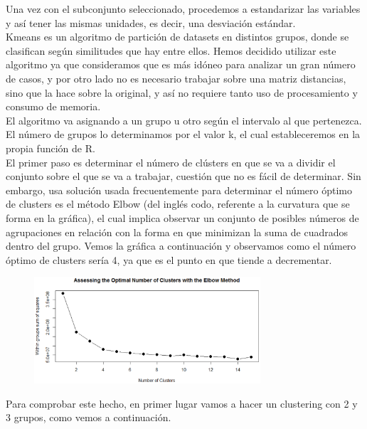 \documentclass[10pt]{article}
\begin{document}
Una vez con el subconjunto seleccionado, procedemos a estandarizar las variables y así tener las mismas unidades, es decir, una desviación estándar.\\

Kmeans es un algoritmo de partición de datasets en distintos grupos, donde se clasifican según similitudes que hay entre ellos. 
Hemos decidido utilizar este algoritmo ya que consideramos que es más idóneo para analizar un gran número de casos, y por otro lado no es necesario trabajar sobre una matriz distancias, sino que la hace sobre la original, y así no requiere tanto uso de procesamiento y consumo de memoria. \\

El algoritmo va asignando a un grupo u otro según el intervalo al que pertenezca. El número de grupos lo determinamos por el valor k, el cual estableceremos en la propia función de R.\\

El primer paso es determinar el número de clústers en que se va a dividir el conjunto sobre el que se va a trabajar, cuestión que no es fácil de determinar. Sin embargo, usa solución usada frecuentemente para determinar el número óptimo de clusters es el método Elbow (del inglés codo, referente a la curvatura que se forma en la gráfica), el cual implica observar un conjunto de posibles números de agrupaciones en relación con la forma en que minimizan la suma de cuadrados dentro del grupo. Vemos la gráfica a continuación y observamos como el número óptimo de clusters sería 4, ya que es el punto en que tiende a decrementar.\\

\begin{figure}[H]
	\begin{center}
 		\includegraphics[width = 0.75\textwidth]{Imagenes/numcluster.eps}
	\end{center} 
\end{figure}

Para comprobar este hecho, en primer lugar vamos a hacer un clustering con 2 y 3 grupos, como vemos a continuación.\\
\end{document}
